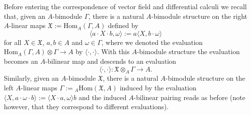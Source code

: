 \documentclass{article}
\theoremstyle{definition}
\begin{document}
	Before entering the correspondence of vector field and differential calculi we recall that, given an $A$-bimodule $\Gamma$, there is a natural $A$-bimodule structure on the right $A$-linear maps $\mathfrak{X}:=\mathrm{Hom}_A(\Gamma,A)$ defined by
	\begin{equation}\label{A-bimod}
		\langle a\cdot X\cdot b,\omega\rangle:=a\langle X,b\cdot\omega\rangle
	\end{equation}
	for all $X\in\mathfrak{X}$, $a,b\in A$ and $\omega\in\Gamma$, where we denoted the evaluation $\mathrm{Hom}_A(\Gamma,A)\otimes\Gamma\to A$ by $\langle\cdot,\cdot\rangle$. With this $A$-bimodule structure the evaluation becomes an $A$-bilinear map and descends to an evaluation
	$$
	\langle\cdot,\cdot\rangle\colon\mathfrak{X}\otimes_A\Gamma\to A.
	$$
	Similarly, given an $A$-bimodule $\mathfrak{X}$, there is a natural $A$-bimodule structure on the left $A$-linear maps $\Gamma:={}_A\mathrm{Hom}(\mathfrak{X},A)$ induced by the evaluation $\langle X,a\cdot\omega\cdot b\rangle:=\langle X\cdot a,\omega\rangle b$ and the induced $A$-bilinear pairing reads as before (note however, that they correspond to different evaluations).
	
\end{document}
